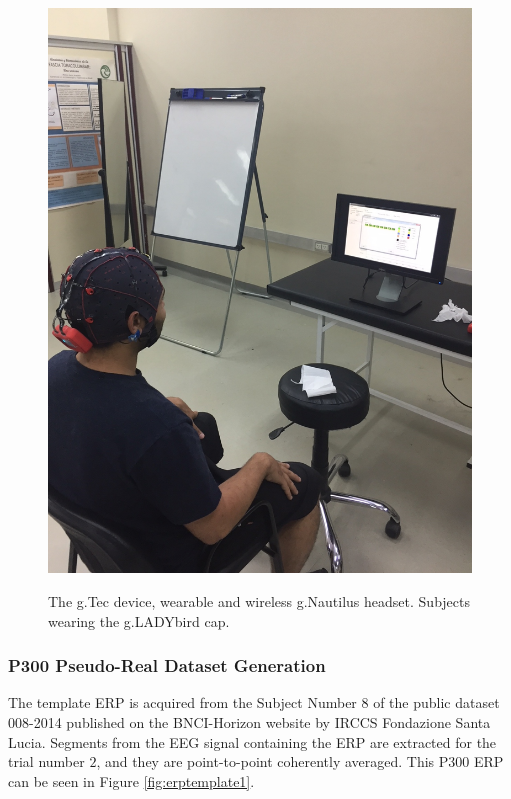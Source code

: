 \begin{figure}[htb]
{\includegraphics[width=.45\linewidth]{images/gTecsubject2.jpg}}
\caption[g.Tec Device]{The g.Tec device, wearable and wireless g.Nautilus headset. Subjects wearing the g.LADYbird cap. }
\label{fig:gtecdevice}
\end{figure}


\subsubsection{P300 Pseudo-Real Dataset Generation}

The template ERP is acquired from the Subject Number $8$ of the public dataset 008-2014  \cite{Riccio2013} published on the BNCI-Horizon website \cite{Brunner2014} by IRCCS Fondazione Santa Lucia. Segments from the EEG signal containing the ERP are extracted for the trial number $2$, and they are point-to-point coherently averaged.  This P300 ERP can be seen in Figure  \ref{fig:erptemplate1}. 

